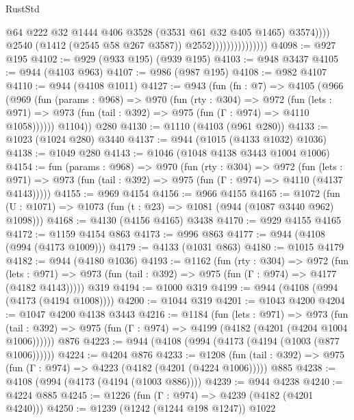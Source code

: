 \begin{lexlean}{RustStd}
\begin{coremodule}
                                          @64
                                          @222
                                          @32
                                          @1444
                                          @406
                                          @3528
                                          (@3531 @61 @32 @405 @1465)
                                          @3574))))
                                  @2540
                                  (@1412 (@2545 @58 @267 @3587))
                                  @2552)))))))))))))))
@4098 := @927 @195
@4102 := @929 (@933 @195) (@939 @195)
@4103 := @948 @3437
@4105 := @944 (@4103 @963)
@4107 := @986 (@987 @195)
@4108 := @982 @4107
@4110 := @944 (@4108 @1011)
@4127 := @943
    (fun (fn : @7) =>
    @4105
      (@966
        (@969
          (fun (params : @968) =>
          @970
            (fun (rty : @304) =>
            @972
              (fun (lets : @971) =>
              @973 (fun (tail : @392) => @975 (fun (Γ : @974) => @4110 @1058))))))
        @1104))
    @280
@4130 := @1110 (@4103 (@961 @280))
@4133 := @1023 (@1024 @280) @3440
@4137 := @944 (@1015 (@4133 @1032) @1036)
@4138 := @1049 @280
@4143 := @1046 (@1048 @4138 @3443 @1004 @1006)
@4154 := fun (params : @968) =>
  @970
    (fun (rty : @304) =>
    @972
      (fun (lets : @971) =>
      @973 (fun (tail : @392) => @975 (fun (Γ : @974) => @4110 (@4137 @4143)))))
@4155 := @969 @4154
@4156 := @966 @4155
@4165 := @1072 (fun (U : @1071) => @1073 (fun (t : @23) => @1081 (@944 (@1087 @3440 @962) @1098)))
@4168 := @4130 (@4156 @4165) @3438
@4170 := @929 @4155 @4165
@4172 := @1159 @4154 @863
@4173 := @996 @863
@4177 := @944 (@4108 (@994 (@4173 @1009)))
@4179 := @4133 (@1031 @863)
@4180 := @1015 @4179
@4182 := @944 (@4180 @1036)
@4193 := @1162
    (fun (rty : @304) =>
    @972
      (fun (lets : @971) =>
      @973 (fun (tail : @392) => @975 (fun (Γ : @974) => @4177 (@4182 @4143)))))
    @319
@4194 := @1000 @319
@4199 := @944 (@4108 (@994 (@4173 (@4194 @1008))))
@4200 := @1044 @319
@4201 := @1043 @4200
@4204 := @1047 @4200 @4138 @3443
@4216 := @1184
    (fun (lets : @971) =>
    @973 (fun (tail : @392) => @975 (fun (Γ : @974) => @4199 (@4182 (@4201 (@4204 @1004 @1006))))))
    @876
@4223 := @944 (@4108 (@994 (@4173 (@4194 (@1003 (@877 @1006))))))
@4224 := @4204 @876
@4233 := @1208
    (fun (tail : @392) => @975 (fun (Γ : @974) => @4223 (@4182 (@4201 (@4224 @1006)))))
    @885
@4238 := @4108 (@994 (@4173 (@4194 (@1003 @886))))
@4239 := @944 @4238
@4240 := @4224 @885
@4245 := @1226 (fun (Γ : @974) => @4239 (@4182 (@4201 @4240)))
@4250 := @1239 (@1242 (@1244 @198 @1247)) @1022

\end{coremodule}
\end{lexlean}
